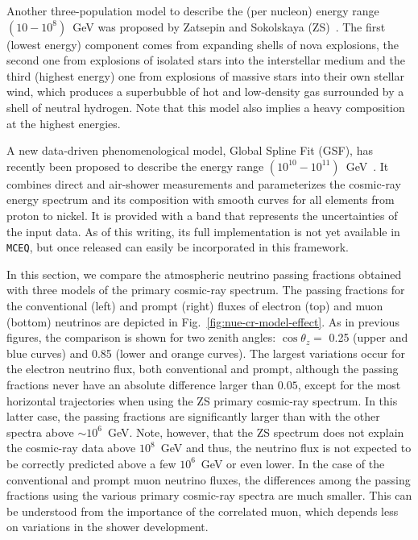 \documentclass[aps,prd,showpacs,letterpaper,onecolumn,longbibliography,superscriptaddress,notitlepage,nofootinbib]{revtex4-1}%
\newcommand{\MCEq}{\texttt{MCE{\scriptsize Q}}}
\begin{document}
Another three-population model to describe the (per nucleon) energy range $(10 - 10^{8})$~GeV was proposed by Zatsepin and Sokolskaya (ZS)~\cite{Zatsepin:2006ci}. The first (lowest energy) component comes from expanding shells of nova explosions, the second one from explosions of isolated stars into the interstellar medium and the third (highest energy) one from explosions of massive stars into their own stellar wind, which produces a superbubble of hot and low-density gas surrounded by a shell of neutral hydrogen. Note that this model also implies a heavy composition at the highest energies.

A new data-driven phenomenological model, Global Spline Fit (GSF), has recently been proposed to describe the energy range $(10^{10} - 10^{11})$~GeV~\cite{Dembinski:2017zsh}. It combines direct and air-shower measurements and parameterizes the cosmic-ray energy spectrum and its composition with smooth curves for all elements from proton to nickel. It is provided with a band that represents the uncertainties of the input data. As of this writing, its full implementation is not yet available in \MCEq, but once released can easily be incorporated in this framework.

In this section, we compare the atmospheric neutrino passing fractions obtained with three models of the primary cosmic-ray spectrum. The passing fractions for the conventional (left) and prompt (right) fluxes of electron (top) and muon (bottom) neutrinos are depicted in Fig.~\ref{fig:nue-cr-model-effect}. As in previous figures, the comparison is shown for two zenith angles: $\cos\theta_z = $ 0.25 (upper and blue curves) and 0.85 (lower and orange curves). The largest variations occur for the electron neutrino flux, both conventional and prompt, although the passing fractions never have an absolute difference larger than $0.05$, except for the most horizontal trajectories when using the ZS primary cosmic-ray spectrum. In this latter case, the passing fractions are significantly larger than with the other spectra above $\sim 10^6$~GeV. Note, however, that the ZS spectrum does not explain the cosmic-ray data above $10^{8}$~GeV and thus, the neutrino flux is not expected to be correctly predicted above a few $10^6$~GeV or even lower. In the case of the conventional and prompt muon neutrino fluxes, the differences among the passing fractions using the various primary cosmic-ray spectra are much smaller. This can be understood from the importance of the correlated muon, which depends less on variations in the shower development. 
\end{document}
